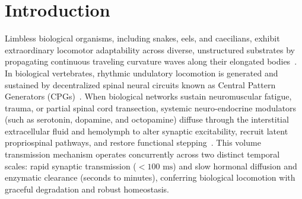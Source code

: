 \documentclass{iopjournal}
\begin{document}
\section{Introduction}
\label{sec:intro}

Limbless biological organisms, including snakes, eels, and caecilians, exhibit extraordinary locomotor adaptability across diverse, unstructured substrates by propagating continuous traveling curvature waves along their elongated bodies~\cite{dickinson2000,hirose1993}. In biological vertebrates, rhythmic undulatory locomotion is generated and sustained by decentralized spinal neural circuits known as Central Pattern Generators (CPGs)~\cite{grillner2006,guertin2013,marder2001}. When biological networks sustain neuromuscular fatigue, trauma, or partial spinal cord transection, systemic neuro-endocrine modulators (such as serotonin, dopamine, and octopamine) diffuse through the interstitial extracellular fluid and hemolymph to alter synaptic excitability, recruit latent propriospinal pathways, and restore functional stepping~\cite{courtine2008,rossignol2011,bargmann2012,sillar2014,edgerton2004}. This volume transmission mechanism operates concurrently across two distinct temporal scales: rapid synaptic transmission ($<100\text{ ms}$) and slow hormonal diffusion and enzymatic clearance (seconds to minutes), conferring biological locomotion with graceful degradation and robust homeostasis.
\end{document}
